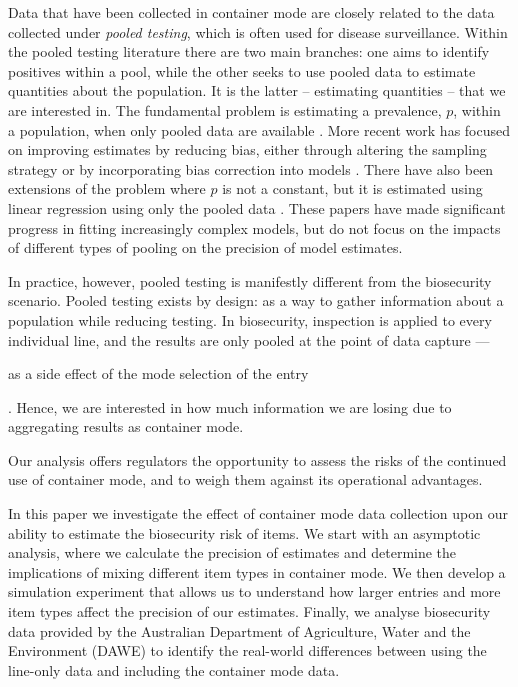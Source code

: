 \documentclass{article}
\newif\ifproofread
\newcommand{\rev}[1]{%
\ifproofread
\hl{#1}%
\else
#1%
\fi
}
\begin{document}
 Data that have been collected in container mode are closely related to the data collected under \emph{pooled testing}, which is often used for disease surveillance. Within the pooled testing literature there are two main branches: one aims to identify positives within a pool, while the other seeks to use pooled data to estimate quantities about the population. It is the latter -- estimating quantities -- that we are interested in. The fundamental problem is estimating a prevalence, \(p\), within a population, when only pooled data are available \citep{thompson_estimation_1962}. More recent work has focused on improving estimates by reducing bias, either through altering the sampling strategy \citep{schaarschmidt_experimental_2007,hepworth_debiased_2009} or by incorporating bias correction into models  \citep{hepworth_bias_2017,hepworth_bias_2021}. There have also been extensions of the problem where \(p\) is not a constant, but it is estimated using linear regression using only the pooled data \citep{delaigle_nonparametric_2015, chatterjee_regression_2020, mcmahan_bayesian_2017, liu_generalized_2020}. These papers have made significant progress in fitting increasingly complex models, but do not focus on the impacts of different types of pooling on the precision of model estimates.

In practice, however, pooled testing is manifestly different from the biosecurity scenario. Pooled testing exists by design: as a way to gather information about a population while reducing testing. In biosecurity, inspection is applied to every individual line, and the results are only pooled at the point of data capture --- \rev{as a side effect of the mode selection of the entry}. Hence, we are interested in how much information we are losing due to aggregating results as container mode. \rev{Our analysis offers regulators the opportunity to assess the risks of the continued use of container mode, and to weigh them against its operational advantages.}

In this paper we investigate the effect of container mode data collection upon our ability to estimate the biosecurity risk of items. We start with an asymptotic analysis, where we calculate the precision of estimates and determine the implications of mixing different item types in container mode. We then develop a simulation experiment that allows us to understand how larger entries and more item types affect the precision of our estimates. Finally, we analyse biosecurity data provided by the Australian Department of Agriculture, Water and the Environment (DAWE) to identify the real-world differences between using the line-only data and including the container mode data.
\end{document}
